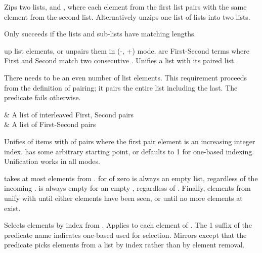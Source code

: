 \begin{description}
Zips two lists,  and , where each element from the first
list pairs with the same element from the second list. Alternatively
unzips one list of lists into two lists.

Only succeeds if the lists and sub-lists have matching lengths.

 up list elements, or unpairs them in (-, +) mode.  are
First-Second terms where First and Second match two consecutive
. Unifies a list with its paired list.

There needs to be an even number of list elements. This requirement
proceeds from the definition of pairing; it pairs the entire list
including the last. The predicate fails otherwise.

\begin{arguments}
 & A list of interleaved First, Second pairs \\
 & A list of First-Second pairs \\
\end{arguments}

\nodescription
Unifies  of items with  of pairs where the first pair
element is an increasing integer index.  has some arbitrary
starting point, or defaults to 1 for one-based indexing. Unification
works in all modes.

 takes at most  elements from .  for  of
zero is always an empty list, regardless of the incoming . 
is always empty for an empty , regardless of . Finally,
elements from  unify with  until either  elements
have been seen, or until no more elements at  exist.

Selects  elements by index from . Applies  to each
element of . The 1 suffix of the predicate name indicates
one-based  used for selection. Mirrors  except that
the predicate picks elements from a list by index rather than by
element removal.


\end{description}
